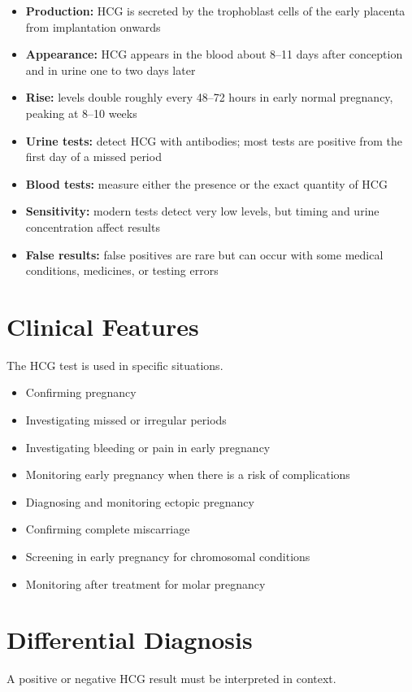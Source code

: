 \begin{itemize}
    \item \textbf{Production:} HCG is secreted by the trophoblast cells of the early placenta from implantation onwards
    \item \textbf{Appearance:} HCG appears in the blood about 8--11 days after conception and in urine one to two days later
    \item \textbf{Rise:} levels double roughly every 48--72 hours in early normal pregnancy, peaking at 8--10 weeks
    \item \textbf{Urine tests:} detect HCG with antibodies; most tests are positive from the first day of a missed period
    \item \textbf{Blood tests:} measure either the presence or the exact quantity of HCG
    \item \textbf{Sensitivity:} modern tests detect very low levels, but timing and urine concentration affect results
    \item \textbf{False results:} false positives are rare but can occur with some medical conditions, medicines, or testing errors
\end{itemize}

\section*{Clinical Features}
The HCG test is used in specific situations.

\begin{itemize}
    \item Confirming pregnancy
    \item Investigating missed or irregular periods
    \item Investigating bleeding or pain in early pregnancy
    \item Monitoring early pregnancy when there is a risk of complications
    \item Diagnosing and monitoring ectopic pregnancy
    \item Confirming complete miscarriage
    \item Screening in early pregnancy for chromosomal conditions
    \item Monitoring after treatment for molar pregnancy
\end{itemize}

\section*{Differential Diagnosis}
A positive or negative HCG result must be interpreted in context.

